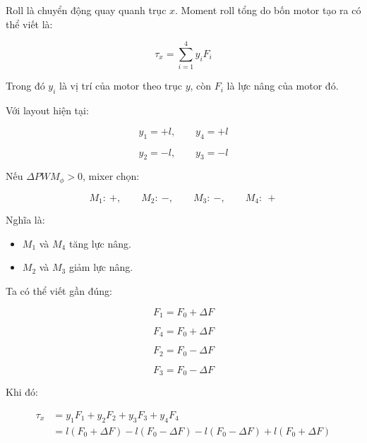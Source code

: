 Roll là chuyển động quay quanh trục $x$. Moment roll tổng do bốn motor tạo ra
có thể viết là:

\begin{equation}
    \tau_x
    =
    \sum_{i=1}^{4} y_iF_i
\end{equation}

Trong đó $y_i$ là vị trí của motor theo trục $y$, còn $F_i$ là lực nâng của
motor đó.

Với layout hiện tại:

\begin{equation}
    y_1 = +l,\qquad y_4 = +l
\end{equation}

\begin{equation}
    y_2 = -l,\qquad y_3 = -l
\end{equation}

Nếu $\Delta PWM_\phi > 0$, mixer chọn:

\begin{equation}
    M_1:\ +,\qquad
    M_2:\ -,\qquad
    M_3:\ -,\qquad
    M_4:\ +
\end{equation}

Nghĩa là:
\begin{itemize}
    \item $M_1$ và $M_4$ tăng lực nâng.
    \item $M_2$ và $M_3$ giảm lực nâng.
\end{itemize}

Ta có thể viết gần đúng:

\begin{equation}
    F_1 = F_0 + \Delta F
\end{equation}

\begin{equation}
    F_4 = F_0 + \Delta F
\end{equation}

\begin{equation}
    F_2 = F_0 - \Delta F
\end{equation}

\begin{equation}
    F_3 = F_0 - \Delta F
\end{equation}

Khi đó:

\begin{equation}
\begin{aligned}
    \tau_x
    &=
    y_1F_1 + y_2F_2 + y_3F_3 + y_4F_4\\
    &=
    l(F_0+\Delta F)
    -l(F_0-\Delta F)
    -l(F_0-\Delta F)
    +l(F_0+\Delta F)
\end{aligned}
\end{equation}

